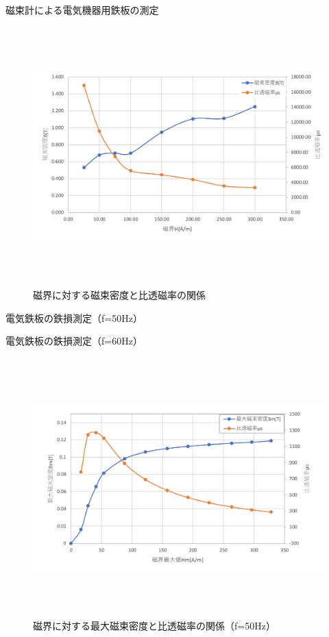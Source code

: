 \begin{table}[htbp]
  \centering
  \caption{磁束計による電気機器用鉄板の測定}
  
\end{table}

\begin{figure}[H]
  \centering
  \includegraphics[height=10cm]{./fig/3.png}
  \caption{磁界に対する磁束密度と比透磁率の関係}
\end{figure}

\begin{table}[htbp]
  \centering
  \caption{電気鉄板の鉄損測定（f=50Hz）}
  \scalebox{0.61} {
    
  }
\end{table}

\begin{table}[htbp]
  \centering
  \caption{電気鉄板の鉄損測定（f=60Hz）}
  \scalebox{0.61} {
    
  }
\end{table}

\begin{figure}[H]
  \centering
  \includegraphics[height=10cm]{./fig/4.png}
  \caption{磁界に対する最大磁束密度と比透磁率の関係（f=50Hz）}
\end{figure}

